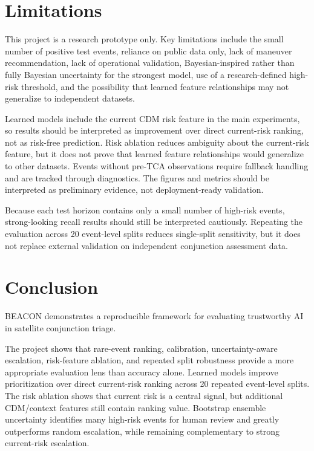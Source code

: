 \documentclass[11pt]{article}
\begin{document}
\section{Limitations}

This project is a research prototype only. Key limitations include the small number of positive test events, reliance on public data only, lack of maneuver recommendation, lack of operational validation, Bayesian-inspired rather than fully Bayesian uncertainty for the strongest model, use of a research-defined high-risk threshold, and the possibility that learned feature relationships may not generalize to independent datasets.

Learned models include the current CDM risk feature in the main experiments, so results should be interpreted as improvement over direct current-risk ranking, not as risk-free prediction. Risk ablation reduces ambiguity about the current-risk feature, but it does not prove that learned feature relationships would generalize to other datasets. Events without pre-TCA observations require fallback handling and are tracked through diagnostics. The figures and metrics should be interpreted as preliminary evidence, not deployment-ready validation.

Because each test horizon contains only a small number of high-risk events, strong-looking recall results should still be interpreted cautiously. Repeating the evaluation across 20 event-level splits reduces single-split sensitivity, but it does not replace external validation on independent conjunction assessment data.

\section{Conclusion}

BEACON demonstrates a reproducible framework for evaluating trustworthy AI in satellite conjunction triage.

The project shows that rare-event ranking, calibration, uncertainty-aware escalation, risk-feature ablation, and repeated split robustness provide a more appropriate evaluation lens than accuracy alone. Learned models improve prioritization over direct current-risk ranking across 20 repeated event-level splits. The risk ablation shows that current risk is a central signal, but additional CDM/context features still contain ranking value. Bootstrap ensemble uncertainty identifies many high-risk events for human review and greatly outperforms random escalation, while remaining complementary to strong current-risk escalation.
\end{document}
